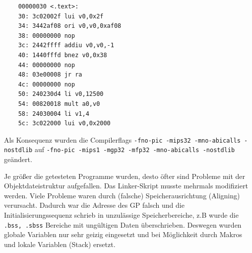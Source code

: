 \begin{code}	
	\begin{verbatim}
	00000030 <.text>:
	30:	3c02002f lui v0,0x2f
	34:	3442af08 ori v0,v0,0xaf08
	38:	00000000 nop
	3c:	2442ffff addiu v0,v0,-1
	40:	1440fffd bnez v0,0x38
	44:	00000000 nop
	48:	03e00008 jr	ra
	4c:	00000000 nop
	50:	240230d4 li v0,12500
	54:	00820018 mult a0,v0
	58:	24030004 li v1,4
	5c:	3c022000 lui v0,0x2000
	\end{verbatim}
	\caption{MIPS-\RN{1} code}
	\label{lst:mips_i_code}
\end{code}

Als Konsequenz wurden die Compilerflags \texttt{-fno-pic -mips32 -mno-abicalls -nostdlib} auf \texttt{-fno-pic -mips1 -mgp32 -mfp32 -mno-abicalls -nostdlib} geändert.


Je größer die getesteten Programme wurden, desto öfter sind Probleme mit der Objektdateistruktur aufgefallen. Das Linker-Skript musste mehrmals modifiziert werden. Viele Probleme waren durch (falsche) Speicherausrichtung (Aligning) verursacht. Dadurch war die Adresse des \gls{GP} falsch und die Initialisierungssequenz schrieb in unzulässige Speicherbereiche, z.B wurde die \texttt{.bss, .sbss} Bereiche mit ungültigen Daten überschrieben. Deswegen wurden globale Variablen nur sehr geizig eingesetzt und bei Möglichkeit durch Makros und lokale Variablen (Stack) ersetzt.

